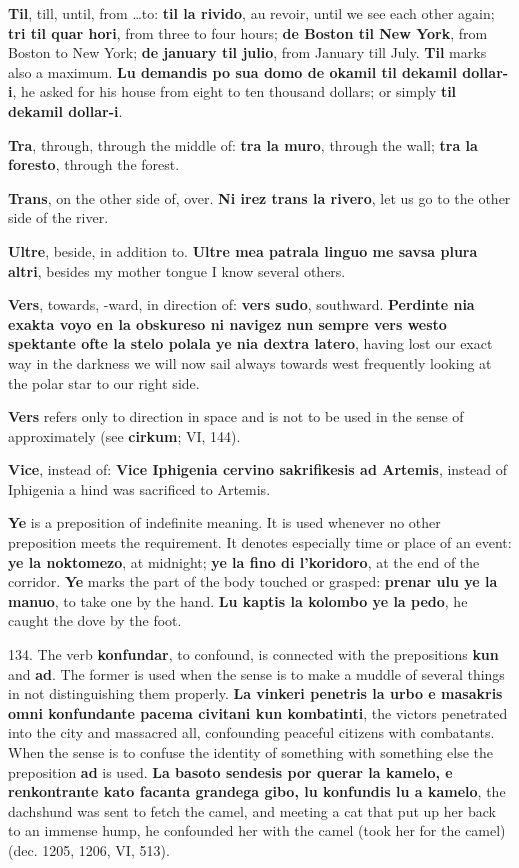 \textbf{Til}, till, until, from \ldots to: \textbf{til la rivido}, au revoir, until we see each other again; \textbf{tri til quar hori}, from three to four hours; \textbf{de Boston til New York}, from Boston to New York; \textbf{de january til julio}, from January till July. \textbf{Til} marks also a maximum. \textbf{Lu demandis po sua domo de okamil til dekamil dollar-i}, he asked for his house from eight to ten thousand dollars; or simply \textbf{til dekamil dollar-i}.

\textbf{Tra}, through, through the middle of: \textbf{tra la muro}, through the wall; \textbf{tra la foresto}, through the forest.

\textbf{Trans}, on the other side of, over. \textbf{Ni irez trans la rivero}, let us go to the other side of the river.

\textbf{Ultre}, beside, in addition to. \textbf{Ultre mea patrala linguo me savsa plura altri}, besides my mother tongue I know several others.

\textbf{Vers}, towards, -ward, in direction of: \textbf{vers sudo}, southward. \textbf{Perdinte nia exakta voyo en la obskureso ni navigez nun sempre vers westo spektante ofte la stelo polala ye nia dextra latero}, having lost our exact way in the darkness we will now sail always towards west frequently looking at the polar star to our right side.

\textbf{Vers} refers only to direction in space and is not to be used in the sense of approximately (see \textbf{cirkum}; VI, 144).

\textbf{Vice}, instead of: \textbf{Vice Iphigenia cervino sakrifikesis ad Artemis}, instead of Iphigenia a hind was sacrificed to Artemis.

\textbf{Ye} is a preposition of indefinite meaning. It is used whenever no other preposition meets the requirement. It denotes especially time or place of an event: \textbf{ye la noktomezo}, at midnight; \textbf{ye la fino di l'koridoro}, at the end of the corridor. \textbf{Ye} marks the part of the body touched or grasped: \textbf{prenar ulu ye la manuo}, to take one by the hand. \textbf{Lu kaptis la kolombo ye la pedo}, he caught the dove by the foot.

134. The verb \textbf{konfundar}, to confound, is connected with the prepositions \textbf{kun} and \textbf{ad}. The former is used when the sense is to make a muddle of several things in not distinguishing them properly. \textbf{La vinkeri penetris la urbo e masakris omni konfundante pacema civitani kun kombatinti}, the victors penetrated into the city and massacred all, confounding peaceful citizens with combatants. When the sense is to confuse the identity of something with something else the preposition \textbf{ad} is used. \textbf{La basoto sendesis por querar la kamelo, e renkontrante kato facanta grandega gibo, lu konfundis lu a kamelo}, the dachshund was sent to fetch the camel, and meeting a cat that put up her back to an immense hump, he confounded her with the camel (took her for the camel) (dec. 1205, 1206, VI, 513).

